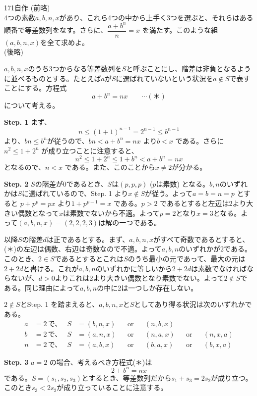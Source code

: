 \begin{prob}{171}{}{自作}
 (前略) \\
 4つの素数$a, b, n, x$があり、これら4つの中から上手く3つを選ぶと、それらはある順番で等差数列をなす。さらに、$\dfrac{a+b^n}{n}=x$ を満たす。このような組$(a, b, n, x)$を全て求めよ。 \\
 (後略)
\end{prob}
$a,b,n,x$のうち3つからなる等差数列を$S$と呼ぶことにし、階差は非負となるように並べるものとする。たとえば$a$が$S$に選ばれていないという状況を$a\notin S$で表すことにする。方程式
\[ a+b^n=nx \qquad\cdots(\text{＊}) \]
について考える。

{\bf \large Step. 1} まず、
\[ n\le (1+1)^{n-1}=2^{n-1}\le b^{n-1} \]
より、$bn\le b^n$が従うので、$bn<a+b^n=nx$ より$b<x$ である。さらに$n^2\le 1+2^n$ が成り立つことに注意すると、
\[ n^2\le 1+2^n\le 1+b^n < a+b^n =nx \]
となるので、$n<x$ である。また、このことから$x\neq 2$が分かる。

{\bf \large Step. 2} $S$の階差が0であるとき、$S$は$(p,p,p)$ ($p$は素数) となる。$b,n$のいずれかは$S$に選ばれているので、Step. 1 より$x\notin S$が従う。よって$a=b=n=p$ とすると $p+p^p=px$ より$1+p^{p-1}=x$ である。$p>2$ であるとすると左辺は2より大きい偶数となって$x$は素数でないから不適。よって$p=2$となり$x=3$となる。よって$(a,b,n,x)=(2,2,2,3)$は解の一つである。

\vspace{1zw}

以降$S$の階差$d$は正であるとする。まず、$a,b,n,x$がすべて奇数であるとすると、(＊)の左辺は偶数、右辺は奇数なので不適。よって$a,b,n$のいずれかが2である。このとき、$2\in S$であるとするとこれは$S$のうち最小の元であって、最大の元は$2+2d$と書ける。これが$a,b,n$のいずれかに等しいから$2+2d$は素数でなければならないが、$d>0$よりこれは2より大きい偶数となり素数でない。よって$2\notin S$である。同じ理由によって$a,b,n$の中に2は一つしか存在しない。

$2\notin S$とStep. 1 を踏まえると、$a,b,n,x$と$S$としてあり得る状況は次のいずれかである。
\begin{align*}
 a&=2 \,\text{で、}& S&=(b,n,x) & &\text{or} & &(n,b,x) & & & &\\
 b&=2 \,\text{で、}& S&=(a,n,x) & &\text{or} & &(n,a,x) & &\text{or} & &(n,x,a) \\
 n&=2 \,\text{で、}& S&=(a,b,x) & &\text{or} & &(b,a,x) & &\text{or} & &(b,x,a)
\end{align*}

{\bf \large Step. 3} $a=2$ の場合、考えるべき方程式(＊)は
\[ 2+b^n=nx \]
である。$S=(s_1,s_2,s_3)$とするとき、等差数列だから$s_1+s_3=2s_2$が成り立つ。このとき$s_3<2s_2$が成り立っていることに注意する。

